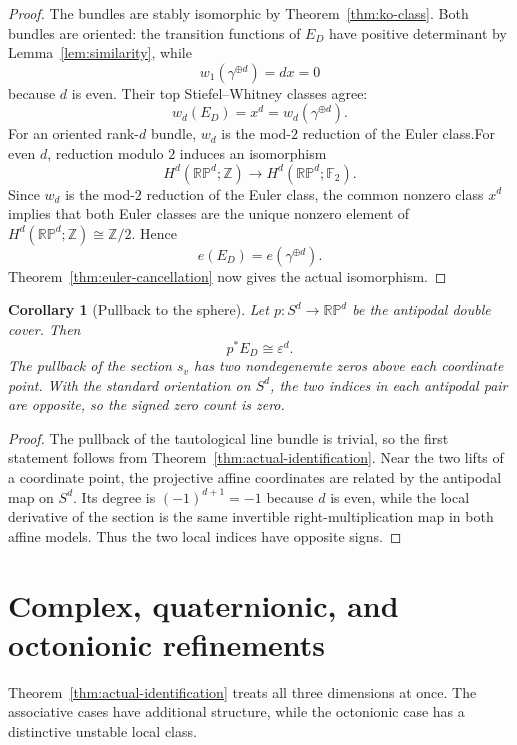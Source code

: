 \documentclass[12pt]{article}
\theoremstyle{plain}
\newtheorem{corollary}[theorem]{Corollary}
\theoremstyle{definition}
\newcommand{\F}{\mathbb F}
\newcommand{\RP}{\mathbb{RP}}
\begin{document}
\begin{proof}
	The bundles are stably isomorphic by Theorem~\ref{thm:ko-class}. Both bundles are oriented: the transition functions of \(E_D\) have
	positive determinant by Lemma~\ref{lem:similarity}, while
	\[
	w_1(\gamma^{\oplus d})=dx=0
	\]
	because \(d\) is even. Their top Stiefel--Whitney classes agree:
	\[
	w_d(E_D)=x^d
	=w_d(\gamma^{\oplus d}).
	\]
	For an oriented rank-$d$ bundle, $w_d$ is the mod-$2$ reduction of the
	Euler class.For even \(d\), reduction modulo \(2\) induces an isomorphism
	\[
	H^d(\RP^d;\mathbb Z)\longrightarrow H^d(\RP^d;\F_2).
	\]
	Since \(w_d\) is the mod-\(2\) reduction of the Euler class, the common
	nonzero class \(x^d\) implies that both Euler classes are the unique
	nonzero element of \(H^d(\RP^d;\mathbb Z)\cong\mathbb Z/2\). Hence
	\[
	e(E_D)=e(\gamma^{\oplus d}).
	\]
	Theorem~\ref{thm:euler-cancellation} now gives the actual isomorphism.
\end{proof}

\begin{corollary}[Pullback to the sphere]
	\label{cor:sphere-pullback}
	Let $p:S^d\to\RP^d$ be the antipodal double cover. Then
	\[
	p^*E_D\cong\varepsilon^d.
	\]
	The pullback of the section $s_v$ has two nondegenerate zeros above each
	coordinate point. With the standard orientation on $S^d$, the two
	indices in each antipodal pair are opposite, so the signed zero count is
	zero.
\end{corollary}

\begin{proof}
	The pullback of the tautological line bundle is trivial, so the first
	statement follows from Theorem~\ref{thm:actual-identification}. Near the
	two lifts of a coordinate point, the projective affine coordinates are
	related by the antipodal map on $S^d$. Its degree is
	$(-1)^{d+1}=-1$ because $d$ is even, while the local derivative of the
	section is the same invertible right-multiplication map in both affine
	models. Thus the two local indices have opposite signs.
\end{proof}

\section{Complex, quaternionic, and octonionic refinements}
\label{sec:special-cases}

Theorem~\ref{thm:actual-identification} treats all three dimensions at
once. The associative cases have additional structure, while the
octonionic case has a distinctive unstable local class.
\end{document}

